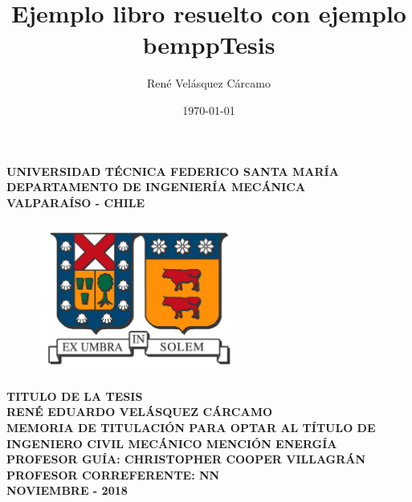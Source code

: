 \documentclass[11pt]{article}
\title{Ejemplo libro resuelto con ejemplo bempp}
\title{Tesis}
\author{René Velásquez Cárcamo}
\date{\today}
\begin{document}
\begin{titlepage}
	
	\begin{center}
		\vspace*{-1in}
		
		\Large \textbf{UNIVERSIDAD TÉCNICA FEDERICO SANTA MARÍA}\\
		\vspace*{0.15in}
		\large \textbf{DEPARTAMENTO DE INGENIERÍA MECÁNICA} \\
		\vspace*{0.15in}
		\textbf{VALPARAÍSO - CHILE}
		
		\begin{figure}[h!]
			\centering\includegraphics[height=50mm]{Imagenes/logousm.jpg} 
		\end{figure}
		\vspace*{0.15in}
		\Large \textbf{TITULO DE LA TESIS}\\
		\vspace*{1in}
		\large\centering \textbf{RENÉ EDUARDO VELÁSQUEZ CÁRCAMO}\\
		\vspace*{0.15in}
		\centering\normalsize \textbf{MEMORIA DE TITULACIÓN PARA OPTAR AL TÍTULO DE INGENIERO CIVIL MECÁNICO MENCIÓN ENERGÍA}\\
		\vspace*{0.6in}
		\centering\normalsize \textbf{PROFESOR GUÍA: \hspace{2.5cm} CHRISTOPHER COOPER VILLAGRÁN}\\
		\vspace*{0.15in}
		\centering\normalsize \textbf{PROFESOR CORREFERENTE: \hspace{1cm} NN}\\
		\vspace*{1in}
		\centering\normalsize \textbf{NOVIEMBRE - 2018}\\
	\end{center}
	
\end{titlepage}
\newpage\null\thispagestyle{empty}\newpage
\end{document}
